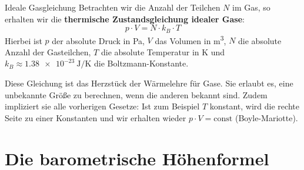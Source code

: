 \begin{importantbox}{Ideale Gasgleichung}
    Betrachten wir die Anzahl der Teilchen $N$ im Gas, so erhalten wir die \textbf{thermische Zustandsgleichung idealer Gase}:
    \begin{equation}\label{eq: ideale_gasgleichung}
        p \cdot V = N \cdot k_B \cdot T
    \end{equation}
    Hierbei ist $p$ der absolute Druck in \si{\pascal}, $V$ das Volumen in \si{\cubic\meter}, $N$ die absolute Anzahl der Gasteilchen, $T$ die absolute Temperatur in \si{\kelvin} und $k_B \approx \SI{1.38e-23}{\joule\per\kelvin}$ die Boltzmann-Konstante.
\end{importantbox}
Diese Gleichung ist das Herzstück der Wärmelehre für Gase. Sie erlaubt es, eine unbekannte Größe zu berechnen, wenn die anderen bekannt sind. Zudem impliziert sie alle vorherigen Gesetze: Ist zum Beispiel $T$ konstant, wird die rechte Seite zu einer Konstanten und wir erhalten wieder $p \cdot V = \text{const}$ (Boyle-Mariotte).


\section{Die barometrische Höhenformel}\label{sec: barometrische_hoehenformel}

